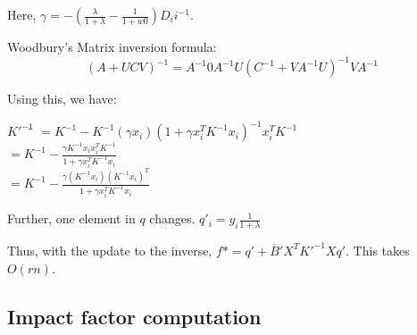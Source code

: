 \documentclass[12pt]{article}
\newcommand{\inv}[1]{#1^{-1}}
\begin{document}
Here, $\gamma = -(\frac{\lambda}{1+\lambda}-\frac{1}{1+w0})\inv{D_ii}$.

Woodbury's Matrix inversion formula: 
$$\inv{(A+UCV)} = \inv{A} 0 \inv{A}U\inv{(\inv{C}+V\inv{A}U)}V\inv{A}$$

Using this, we have:
\begin{tabbing}
$\inv{K'}$\= $= \inv{K} - \inv{K}(\gamma x_i)\inv{(1+ \gamma x_i^T\inv{K}x_i)}x_i^T\inv{K}$\\
\>$=\inv{K} - \frac{\gamma\inv{K}x_i x_i^T\inv{K}}{1+\gamma x_i^T \inv{K} x_i}$\\
\>$=\inv{K} - \frac{\gamma(\inv{K}x_i) (\inv{K}x_i)^T}{1+\gamma x_i^T \inv{K} x_i}$
\end{tabbing}

Further, one element in $q$ changes. $q'_i = y_i \frac{1}{1+\lambda}$

Thus, with the update to the inverse, $f* = q' + \overline{B}'X^T\inv{K'}Xq'$.
This takes $O(rn)$.

\subsection{Impact factor computation}
\end{document}
